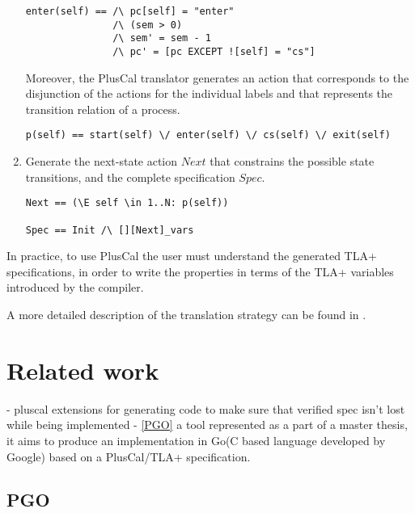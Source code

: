 \documentclass{thesul}
\begin{document}
\begin{enumerate}
\begin{lstlisting}[frame = tlrb, firstnumber = 1, xleftmargin=.2\textwidth, xrightmargin=.2\textwidth]
enter(self) == /\ pc[self] = "enter"
               /\ (sem > 0)
               /\ sem' = sem - 1
               /\ pc' = [pc EXCEPT ![self] = "cs"]
\end{lstlisting}

Moreover, the PlusCal translator generates an action that corresponds to the disjunction of the actions for the individual labels and that represents the transition relation of a process.

\begin{lstlisting}[frame = tlrb, firstnumber = 1, xleftmargin=.05\textwidth, xrightmargin=.05\textwidth]
p(self) == start(self) \/ enter(self) \/ cs(self) \/ exit(self)
\end{lstlisting}

\item Generate the next-state action $Next$ that constrains the possible state transitions, and the complete specification $Spec$.

\begin{lstlisting}[frame = tlrb, firstnumber = 1, xleftmargin=.2\textwidth, xrightmargin=.2\textwidth]
Next == (\E self \in 1..N: p(self))

Spec == Init /\ [][Next]_vars

\end{lstlisting}

\end{enumerate}


In practice, to use PlusCal the user must understand the generated TLA+ specifications, in order to write the properties in terms of the TLA+ variables introduced by the compiler.

A more detailed description of the translation strategy can be found in \cite{pcalAlgo}.

\chapter{Related work}

- pluscal extensions for generating code to make sure that verified spec isn't lost while being implemented
- \ref{PGO} a tool represented as a part of a master thesis, it aims to produce an implementation in Go(C based language developed by Google) based on a PlusCal/TLA+ specification.

\section{PGO}
\end{document}

